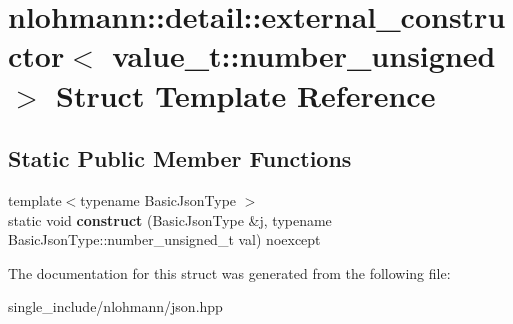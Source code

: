 \hypertarget{structnlohmann_1_1detail_1_1external__constructor_3_01value__t_1_1number__unsigned_01_4}{}\section{nlohmann\+:\+:detail\+:\+:external\+\_\+constructor$<$ value\+\_\+t\+:\+:number\+\_\+unsigned $>$ Struct Template Reference}
\label{structnlohmann_1_1detail_1_1external__constructor_3_01value__t_1_1number__unsigned_01_4}
\subsection*{Static Public Member Functions}
\begin{DoxyCompactItemize}
\item 
\mbox{\label{structnlohmann_1_1detail_1_1external__constructor_3_01value__t_1_1number__unsigned_01_4_a17969b14852f43e04353858c87b0f539}} 
{\footnotesize template$<$typename Basic\+Json\+Type $>$ }\\static void {\bfseries construct} (Basic\+Json\+Type \&j, typename Basic\+Json\+Type\+::number\+\_\+unsigned\+\_\+t val) noexcept
\end{DoxyCompactItemize}


The documentation for this struct was generated from the following file\+:\begin{DoxyCompactItemize}
\item 
single\+\_\+include/nlohmann/json.\+hpp\end{DoxyCompactItemize}
